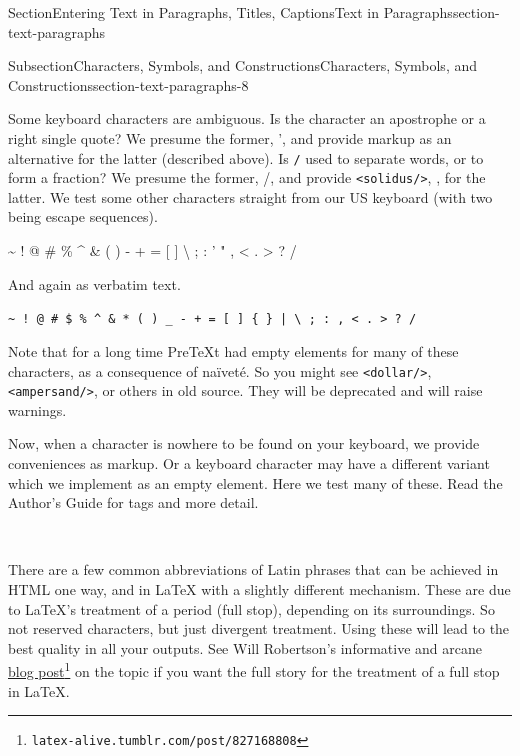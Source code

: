 \documentclass[twoside,10pt,]{article}
\newcommand{\mono}[1]{\texttt{#1}}
\newcommand{\swungdash}{\raisebox{-2.25ex}{\scalebox{2}{\~{}}}}
\numberwithin{equation}{section}
\begin{document}
\begin{sectionptx}{Section}{Entering Text in Paragraphs, Titles, Captions}{}{Text in Paragraphs}{}{}{section-text-paragraphs}
\begin{subsectionptx}{Subsection}{Characters, Symbols, and Constructions}{}{Characters, Symbols, and Constructions}{}{}{section-text-paragraphs-8}
\par
Some keyboard characters are ambiguous.  Is the character \mono{\textquotesingle{}} an apostrophe or a right single quote?  We presume the former, ', and provide markup as an alternative for the latter (described above).  Is \mono{/} used to separate words, or to form a fraction?  We presume the former, \slash{}, and provide \mono{<solidus/>}, \textfractionsolidus{}, for the latter.  We test some other characters straight from our US keyboard (with two being escape sequences).%
\par
\textasciitilde{} \textasciigrave{} ! @ \# \textdollar{} \% \textasciicircum{} \& \textasteriskcentered{} ( ) \textunderscore{} - + = [ ] \textbraceleft{} \textbraceright{} \textbar{} \textbackslash{} ; : ' " , \textless{} . \textgreater{} ? \slash{}%
\par
And again  as verbatim text.%
\par
\mono{\textasciitilde{} \textasciigrave{} ! @ \# \$ \% \textasciicircum{} \& * ( ) \_ - + = [ ] \{ \} | \textbackslash{} ; : \textquotesingle{} \textquotedbl{} , < . > ? /}%
\par
Note that for a long time PreTeXt had empty elements for many of these characters, as a consequence of naïveté.  So you might see \mono{<dollar/>}, \mono{<ampersand/>}, or others in old source.  They will be deprecated and will raise warnings.%
\par
Now, when a character is nowhere to be found on your keyboard, we provide conveniences as markup.  Or a keyboard character may have a different variant which we implement as an empty element.  Here we test many of these.  Read the Author's Guide for tags and more detail.%
\par
\textcopyright{}~~ \textcircledP{}~~ \textcopyleft{}~~ \textregistered{}~~ \texttrademark{}~~ \textservicemark{}~~ \textellipsis{}~~ \textperiodcentered{}~~ \swungdash{}~~ \textperthousand{}~~ \textpilcrow{}~~ \textsection{}~~ \textminus{}~~ \texttimes{}~~ \textfractionsolidus{}~~ \textdiv{}~~ \textpm{}%
\par
There are a few  common abbreviations of Latin phrases that can be achieved in HTML one way, and in \LaTeX{} with a slightly different mechanism.  These are due to \LaTeX{}'s treatment of a period (full stop), depending on its surroundings.  So not reserved characters, but just divergent treatment.  Using these will lead to the best quality in all your outputs.  See Will Robertson's informative and arcane \href{http://latex-alive.tumblr.com/post/827168808/correct-punctuation-spaces}{blog post}\footnote{\nolinkurl{latex-alive.tumblr.com/post/827168808}\label{section-text-paragraphs-8-10-4}} on the topic if you want the full story for the treatment of a full stop in \LaTeX{}.%

\end{subsectionptx}
\end{sectionptx}
\end{document}
